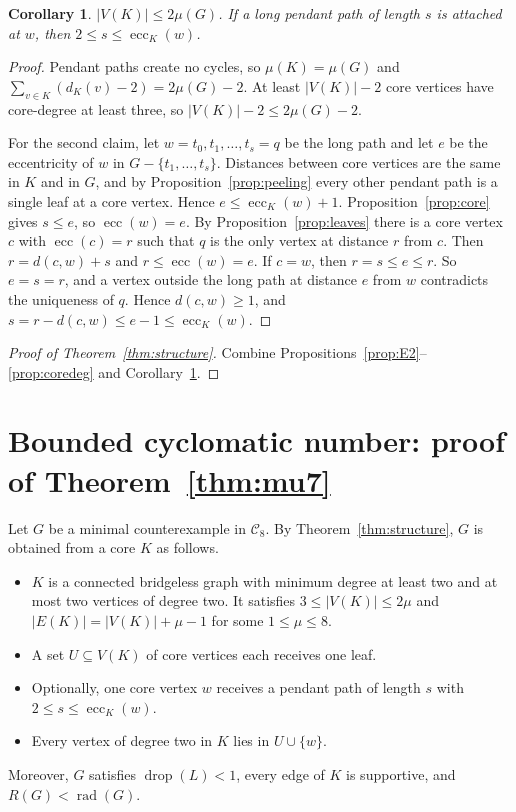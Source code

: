 \documentclass[11pt,a4paper]{article}
\newtheorem{corollary}[theorem]{Corollary}
\theoremstyle{definition}
\newcommand{\rad}{\operatorname{rad}}
\newcommand{\ecc}{\operatorname{ecc}}
\newcommand{\drop}{\operatorname{drop}}
\newcommand{\C}{\mathcal{C}}
\begin{document}
\begin{corollary}\label{cor:size}
$|V(K)|\le2\mu(G)$. If a long pendant path of length $s$ is attached at $w$, then $2\le s\le\ecc_K(w)$.
\end{corollary}
\begin{proof}
Pendant paths create no cycles, so $\mu(K)=\mu(G)$ and $\sum_{v\in K}(d_K(v)-2)=2\mu(G)-2$. At least $|V(K)|-2$ core vertices have core-degree at least three, so $|V(K)|-2\le2\mu(G)-2$.

For the second claim, let $w=t_0,t_1,\dots,t_s=q$ be the long path and let $e$ be the eccentricity of $w$ in $G-\{t_1,\dots,t_s\}$. Distances between core vertices are the same in $K$ and in $G$, and by Proposition~\ref{prop:peeling} every other pendant path is a single leaf at a core vertex. Hence $e\le\ecc_K(w)+1$. Proposition~\ref{prop:core} gives $s\le e$, so $\ecc(w)=e$. By Proposition~\ref{prop:leaves} there is a core vertex $c$ with $\ecc(c)=r$ such that $q$ is the only vertex at distance $r$ from $c$. Then $r=d(c,w)+s$ and $r\le\ecc(w)=e$. If $c=w$, then $r=s\le e\le r$. So $e=s=r$, and a vertex outside the long path at distance $e$ from $w$ contradicts the uniqueness of $q$. Hence $d(c,w)\ge1$, and $s=r-d(c,w)\le e-1\le\ecc_K(w)$.
\end{proof}

\begin{proof}[Proof of Theorem~\ref{thm:structure}]
Combine Propositions~\ref{prop:E2}--\ref{prop:coredeg} and Corollary~\ref{cor:size}.
\end{proof}

\section{\texorpdfstring{Bounded cyclomatic number: proof of Theorem~\ref{thm:mu7}}{Bounded cyclomatic number}}\label{sec:computation}

Let $G$ be a minimal counterexample in $\C_8$. By Theorem~\ref{thm:structure}, $G$ is obtained from a core $K$ as follows.
\begin{itemize}
\item $K$ is a connected bridgeless graph with minimum degree at least two and at most two vertices of degree two. It satisfies $3\le|V(K)|\le2\mu$ and $|E(K)|=|V(K)|+\mu-1$ for some $1\le\mu\le8$.
\item A set $U\subseteq V(K)$ of core vertices each receives one leaf.
\item Optionally, one core vertex $w$ receives a pendant path of length $s$ with $2\le s\le\ecc_K(w)$.
\item Every vertex of degree two in $K$ lies in $U\cup\{w\}$.
\end{itemize}
Moreover, $G$ satisfies $\drop(L)<1$, every edge of $K$ is supportive, and $R(G)<\rad(G)$.
\end{document}
